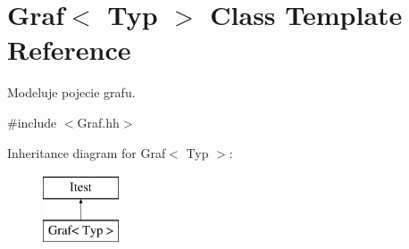 \hypertarget{class_graf}{\section{Graf$<$ Typ $>$ Class Template Reference}
\label{class_graf}
}


Modeluje pojecie grafu.  




{\ttfamily \#include $<$Graf.\-hh$>$}

Inheritance diagram for Graf$<$ Typ $>$\-:\begin{figure}[H]
\begin{center}
\leavevmode
\includegraphics[height=2.000000cm]{class_graf}
\end{center}
\end{figure}
